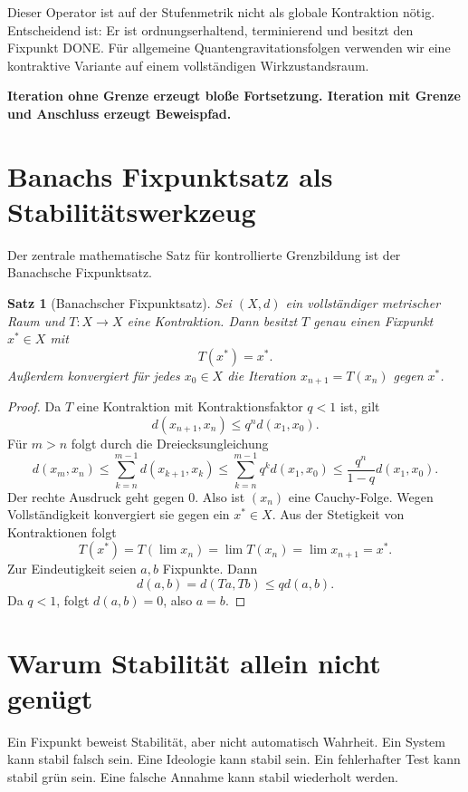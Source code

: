 \documentclass[11pt,a4paper,oneside]{scrartcl}
\theoremstyle{qikstyle}
\newtheorem{satz}{Satz}[section]
\newenvironment{merksatz}{\begin{center}\begin{minipage}{0.92\linewidth}\sffamily\bfseries}{\end{minipage}\end{center}}
\begin{document}
Dieser Operator ist auf der Stufenmetrik nicht als globale Kontraktion nötig. Entscheidend ist: Er ist ordnungserhaltend, terminierend und besitzt den Fixpunkt DONE. Für allgemeine Quantengravitationsfolgen verwenden wir eine kontraktive Variante auf einem vollständigen Wirkzustandsraum.

\begin{merksatz}
Iteration ohne Grenze erzeugt bloße Fortsetzung. Iteration mit Grenze und Anschluss erzeugt Beweispfad.
\end{merksatz}
\newpage

\section{Banachs Fixpunktsatz als Stabilitätswerkzeug}

Der zentrale mathematische Satz für kontrollierte Grenzbildung ist der Banachsche Fixpunktsatz.

\begin{satz}[Banachscher Fixpunktsatz]
Sei \((X,d)\) ein vollständiger metrischer Raum und \(T:X\to X\) eine Kontraktion. Dann besitzt \(T\) genau einen Fixpunkt \(x^*\in X\) mit
\[
T(x^*)=x^*.
\]
Außerdem konvergiert für jedes \(x_0\in X\) die Iteration \(x_{n+1}=T(x_n)\) gegen \(x^*\).
\end{satz}

\begin{proof}
Da \(T\) eine Kontraktion mit Kontraktionsfaktor \(q<1\) ist, gilt
\[
d(x_{n+1},x_n)\leq q^n d(x_1,x_0).
\]
Für \(m>n\) folgt durch die Dreiecksungleichung
\[
d(x_m,x_n)\leq \sum_{k=n}^{m-1} d(x_{k+1},x_k)
\leq \sum_{k=n}^{m-1} q^k d(x_1,x_0)
\leq \frac{q^n}{1-q}d(x_1,x_0).
\]
Der rechte Ausdruck geht gegen 0. Also ist \((x_n)\) eine Cauchy-Folge. Wegen Vollständigkeit konvergiert sie gegen ein \(x^*\in X\). Aus der Stetigkeit von Kontraktionen folgt
\[
T(x^*)=T(\lim x_n)=\lim T(x_n)=\lim x_{n+1}=x^*.
\]
Zur Eindeutigkeit seien \(a,b\) Fixpunkte. Dann
\[
d(a,b)=d(Ta,Tb)\leq qd(a,b).
\]
Da \(q<1\), folgt \(d(a,b)=0\), also \(a=b\).
\end{proof}
\newpage

\section{Warum Stabilität allein nicht genügt}

Ein Fixpunkt beweist Stabilität, aber nicht automatisch Wahrheit. Ein System kann stabil falsch sein. Eine Ideologie kann stabil sein. Ein fehlerhafter Test kann stabil grün sein. Eine falsche Annahme kann stabil wiederholt werden.
\end{document}
